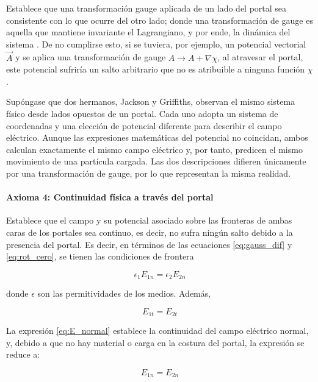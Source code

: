 \documentclass[12pt, twocolumn]{article}
\begin{document}
Establece que una transformación gauge aplicada de un lado del portal sea consistente con lo que ocurre del otro lado; donde una transformación de gauge es aquella que mantiene invariante el Lagrangiano, y por ende, la dinámica del sistema \cite{WikipediaGauge}. De no cumplirse esto, si se tuviera, por ejemplo, un potencial vectorial $\vec{A}$ y se aplica una transformación de gauge $A \to A + \nabla \chi$, al atravesar el portal, este potencial sufriría un salto arbitrario que no es atribuible a ninguna función $\chi$.

Supóngase que dos hermanos, Jackson y Griffiths, observan el mismo sistema físico desde lados opuestos de un portal. Cada uno adopta un sistema de coordenadas y una elección de potencial diferente para describir el campo eléctrico. Aunque las expresiones matemáticas del potencial no coincidan, ambos calculan exactamente el mismo campo eléctrico y, por tanto, predicen el mismo movimiento de una partícula cargada. Las dos descripciones difieren únicamente por una transformación de gauge, por lo que representan la misma realidad.

\paragraph{Axioma 4: Continuidad física a través del portal}

Establece que el campo y su potencial asociado sobre las fronteras de ambas caras de los portales sea continuo, es decir, no sufra ningún salto debido a la presencia del portal. Es decir, en términos de las ecuaciones \ref{eq:gauss_dif} y \ref{eq:rot_cero}, se tienen las condiciones de frontera

\begin{equation} \label{eq:E_normal}
    \epsilon_1 E_{1n} = \epsilon_2 E_{2n}
\end{equation}

donde $\epsilon$ son las permitividades de los medios. Además,

\begin{equation}
    E_{1t} = E_{2t}
\end{equation}

La expresión \ref{eq:E_normal} establece la continuidad del campo eléctrico normal, y, debido a que no hay material o carga en la costura del portal, la expresión se reduce a:

\begin{equation}
    E_{1n} = E_{2n}
\end{equation}
\end{document}
